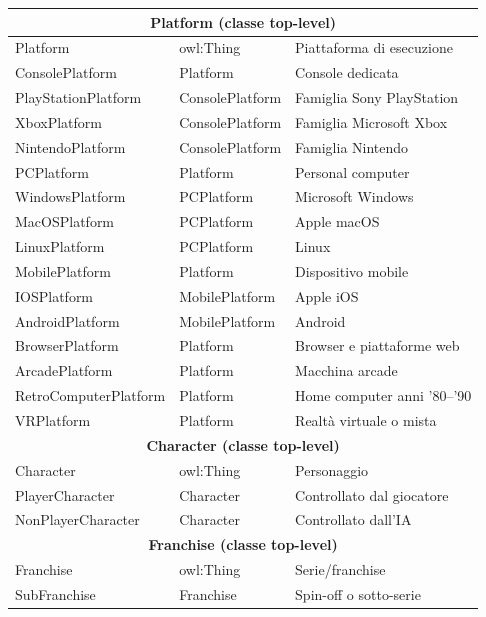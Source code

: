 \begin{longtable}{llp{5cm}}
\multicolumn{3}{c}{\textbf{Platform (classe top-level)}} \\
\midrule
Platform            & owl:Thing       & Piattaforma di esecuzione \\
ConsolePlatform     & Platform        & Console dedicata \\
PlayStationPlatform & ConsolePlatform & Famiglia Sony PlayStation \\
XboxPlatform        & ConsolePlatform & Famiglia Microsoft Xbox \\
NintendoPlatform    & ConsolePlatform & Famiglia Nintendo \\
PCPlatform          & Platform        & Personal computer \\
WindowsPlatform     & PCPlatform      & Microsoft Windows \\
MacOSPlatform       & PCPlatform      & Apple macOS \\
LinuxPlatform       & PCPlatform      & Linux \\
MobilePlatform      & Platform        & Dispositivo mobile \\
IOSPlatform         & MobilePlatform  & Apple iOS \\
AndroidPlatform     & MobilePlatform  & Android \\
BrowserPlatform     & Platform        & Browser e piattaforme web \\
ArcadePlatform      & Platform        & Macchina arcade \\
RetroComputerPlatform & Platform      & Home computer anni '80--'90 \\
VRPlatform          & Platform        & Realt\`a virtuale o mista \\
\midrule

\multicolumn{3}{c}{\textbf{Character (classe top-level)}} \\
\midrule
Character           & owl:Thing       & Personaggio \\
PlayerCharacter     & Character       & Controllato dal giocatore \\
NonPlayerCharacter  & Character       & Controllato dall'IA \\
\midrule

\multicolumn{3}{c}{\textbf{Franchise (classe top-level)}} \\
\midrule
Franchise           & owl:Thing       & Serie/franchise \\
SubFranchise        & Franchise       & Spin-off o sotto-serie \\
\midrule


\end{longtable}
